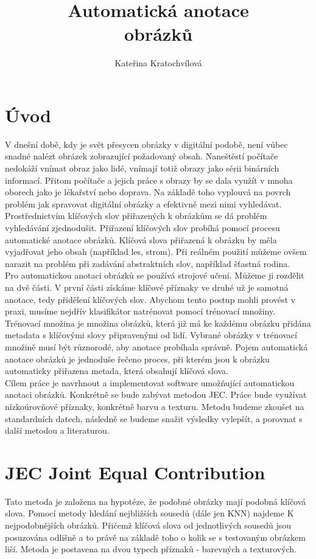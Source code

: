 \documentclass[czech,BP]{thesiskiv}
\author{Kateřina Kratochvílová}
\title{Automatická anotace\\obrázků}
\begin{document}
%
\maketitle
\tableofcontents

\chapter{Úvod}
V dnešní době, kdy je svět přesycen obrázky v digitální podobě, není vůbec snadné nalézt obrázek zobrazující požadovaný obsah. Naneštěstí počítače nedokáží vnímat obraz jako lidé, vnímají totiž obrazy jako sérii binárních informací. Přitom počítače a jejich práce s obrazy by se dala využít v mnoha oborech jako je lékařství nebo doprava. Na základě toho vyplouvá na povrch problém jak spravovat digitální obrázky a efektivně mezi nimi vyhledávat. Prostřednictvím klíčových slov přiřazených k obrázkům se dá problém vyhledávání zjednodušit. Přiřazení klíčových slov probíhá pomocí procesu automatické anotace obrázků. Klíčová slova přiřazená k obrázku by měla vyjadřovat jeho obsah (například les, strom). Při reálném použití můžeme ovšem narazit na problém při zadávání abstraktních slov, například šťastná rodina.  
\\
Pro automatickou anotaci obrázků se používá strojové učení. Můžeme ji rozdělit na dvě části. V první části získáme klíčové příznaky ve druhé už je samotná anotace, tedy přidělení klíčových slov. Abychom tento postup mohli provést v praxi, musíme nejdřív klasifikátor natrénovat pomocí trénovací množiny. Trénovací množina je množina obrázků, která již má ke každému obrázku přidána metadata s klíčovými slovy připravenými od lidí. Vybrané obrázky v trénovací množině musí být různorodé, aby anotace probíhala správně. Pojem automatická anotace obrázků je jednoduše řečeno proces, při kterém jsou k obrázku automaticky přiřazena metada, která obsahují klíčová slova. 
\\
Cílem práce je navrhnout a implementovat software umožňující automatickou anotaci obrázků. Konkrétně se bude zabývat metodou JEC. Práce bude využívat nízkoúrovňové příznaky, konkrétně barvu a texturu. Metodu budeme zkoušet na standardních datech, následně se budeme snažit výsledky vylepšít, a porovnat s další metodou a literaturou.

% 
%

{\raggedright\small

}

\chapter{JEC Joint Equal Contribution}
Tato metoda je založena na hypotéze, že podobné obrázky mají podobná klíčová slova. Pomocí metody hledání nejbližších sousedů (dále jen KNN) najdeme K nejpodobnějších obrázků. Přičemž klíčová slova od jednotlivých sousedů jsou posuzována odlišně a to právě na základě toho o kolik se s testovaným obrázkem liší. Metoda je postavena na dvou typech příznaků - barevných a texturových. 
\end{document}

